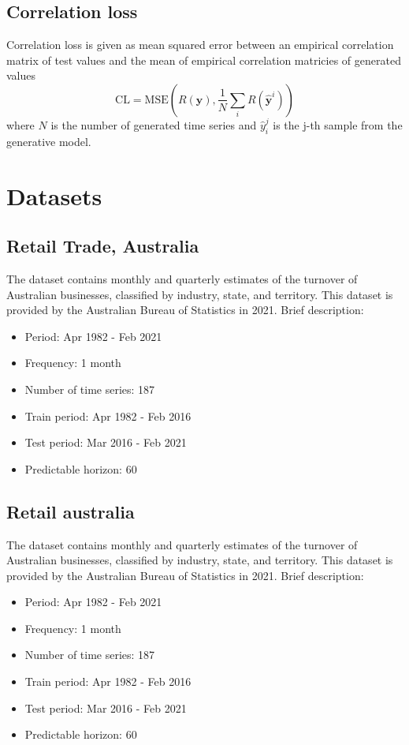 \documentclass[12pt,a4paper]{article}
\begin{document}
\subsection{Correlation loss}

Correlation loss is given as mean squared error between an empirical correlation matrix of test values and the mean of empirical correlation matricies of generated values
$$\text{CL} = \text{MSE} \left( R (\mathbf y), \frac{1}{N} \sum_i  R(\hat{\mathbf y}^i) \right)$$
where $N$ is the number of generated time series and $\hat y_{i}^j$ is the j-th sample from the generative model.

\section{Datasets}

\subsection{Retail Trade, Australia}
The dataset contains monthly and quarterly estimates of the turnover of Australian businesses, classified by industry, state, and territory. This dataset is provided by the Australian Bureau of Statistics in 2021. Brief description:
\begin{itemize}
    \item Period: Apr 1982 - Feb 2021
    \item Frequency: 1 month
    \item Number of time series: 187
    \item Train period: Apr 1982 - Feb 2016
    \item Test period: Mar 2016 - Feb 2021
    \item Predictable horizon: 60 
\end{itemize}

\subsection{Retail australia}
The dataset contains monthly and quarterly estimates of the turnover of Australian businesses, classified by industry, state, and territory. This dataset is provided by the Australian Bureau of Statistics in 2021. Brief description:
\begin{itemize}
    \item Period: Apr 1982 - Feb 2021
    \item Frequency: 1 month
    \item Number of time series: 187
    \item Train period: Apr 1982 - Feb 2016
    \item Test period: Mar 2016 - Feb 2021
    \item Predictable horizon: 60
\end{itemize}
\end{document}
